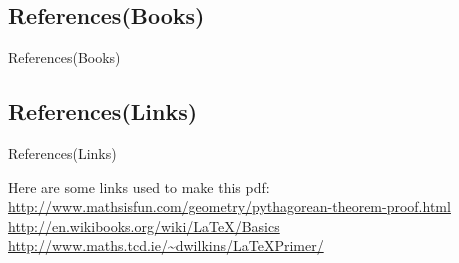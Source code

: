 \documentclass[10pt]{beamer}
\begin{document}
\subsection{References(Books)}
\begin{frame}{References(Books)}
\nocite{*}


\transfade
\end{frame}

\subsection{References(Links)}
\begin{frame}{References(Links)}
\begin{block}{Here are some links used to make this pdf:}
	\url{http://www.mathsisfun.com/geometry/pythagorean-theorem-proof.html}
	\url{http://en.wikibooks.org/wiki/LaTeX/Basics}
	\url{http://www.maths.tcd.ie/~dwilkins/LaTeXPrimer/}
\transfade
\end{block}
\end{frame}
\end{document}
